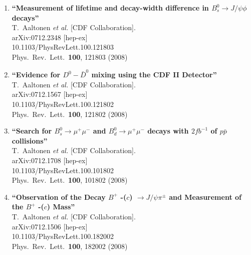 \documentclass{article}
\begin{document}
\begin{enumerate}
\item%
{\bf ``Measurement of lifetime and decay-width difference in $B^0_{s} \to J/\psi \phi$ decays''}
  \\{}T.~Aaltonen {\it et al.}  [CDF Collaboration].
  \\{}arXiv:0712.2348 [hep-ex]
    \\{}10.1103/PhysRevLett.100.121803
\\{}Phys.\ Rev.\ Lett.\  {\bf 100}, 121803 (2008) %


\item%
{\bf ``Evidence for $D^0 - \bar{D}^0$ mixing using the CDF II Detector''}
  \\{}T.~Aaltonen {\it et al.}  [CDF Collaboration].
  \\{}arXiv:0712.1567 [hep-ex]
    \\{}10.1103/PhysRevLett.100.121802
\\{}Phys.\ Rev.\ Lett.\  {\bf 100}, 121802 (2008) %


\item%
{\bf ``Search for $B^0_{s} \to \mu^{+} \mu^{-}$ and $B^0_{d} \to \mu^{+} \mu^{-}$ decays with $2fb^{-1}$ of $p \bar{p}$ collisions''}
  \\{}T.~Aaltonen {\it et al.}  [CDF Collaboration].
  \\{}arXiv:0712.1708 [hep-ex]
    \\{}10.1103/PhysRevLett.100.101802
\\{}Phys.\ Rev.\ Lett.\  {\bf 100}, 101802 (2008) %


\item%
{\bf ``Observation of the Decay $B^+$ -($c$) $\to J/\psi \pi^\pm$ and Measurement of the $B^+$ -($c$) Mass''}
  \\{}T.~Aaltonen {\it et al.}  [CDF Collaboration].
  \\{}arXiv:0712.1506 [hep-ex]
    \\{}10.1103/PhysRevLett.100.182002
\\{}Phys.\ Rev.\ Lett.\  {\bf 100}, 182002 (2008) %



\end{enumerate}
\end{document}
